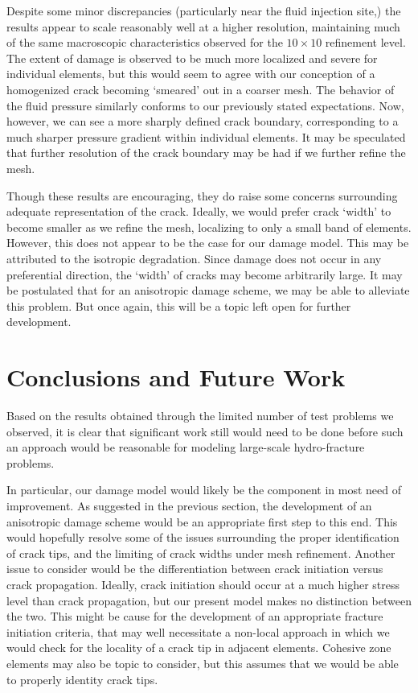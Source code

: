 \documentclass[11pt]{article} %
\begin{document}
Despite some minor discrepancies (particularly near the fluid injection site,) the results appear to scale reasonably well at a higher resolution, maintaining much of the same macroscopic characteristics observed for the $10 \times 10$ refinement level. The extent of damage is observed to be much more localized and severe for individual elements, but this would seem to agree with our conception of a homogenized crack becoming `smeared' out in a coarser mesh. The behavior of the fluid pressure similarly conforms to our previously stated expectations. Now, however, we can see a more sharply defined crack boundary, corresponding to a much sharper pressure gradient within individual elements. It may be speculated that further resolution of the crack boundary may be had if we further refine the mesh.

Though these results are encouraging, they do raise some concerns surrounding adequate representation of the crack. Ideally, we would prefer crack `width' to become smaller as we refine the mesh, localizing to only a small band of elements. However, this does not appear to be the case for our damage model. This may be attributed to the isotropic degradation. Since damage does not occur in any preferential direction, the `width' of cracks may become arbitrarily large. It may be postulated that for an anisotropic damage scheme, we may be able to alleviate this problem. But once again, this will be a topic left open for further development.

\section{Conclusions and Future Work}

Based on the results obtained through the limited number of test problems we observed, it is clear that significant work still would need to be done before such an approach would be reasonable for modeling large-scale hydro-fracture problems.

In particular, our damage model would likely be the component in most need of improvement. As suggested in the previous section, the development of an anisotropic damage scheme would be an appropriate first step to this end. This would hopefully resolve some of the issues surrounding the proper identification of crack tips, and the limiting of crack widths under mesh refinement. Another issue to consider would be the differentiation between crack initiation versus crack propagation. Ideally, crack initiation should occur at a much higher stress level than crack propagation, but our present model makes no distinction between the two. This might be cause for the development of an appropriate fracture initiation criteria, that may well necessitate a non-local approach in which we would check for the locality of a crack tip in adjacent elements. Cohesive zone elements may also be topic to consider, but this assumes that we would be able to properly identity crack tips.
\end{document}
